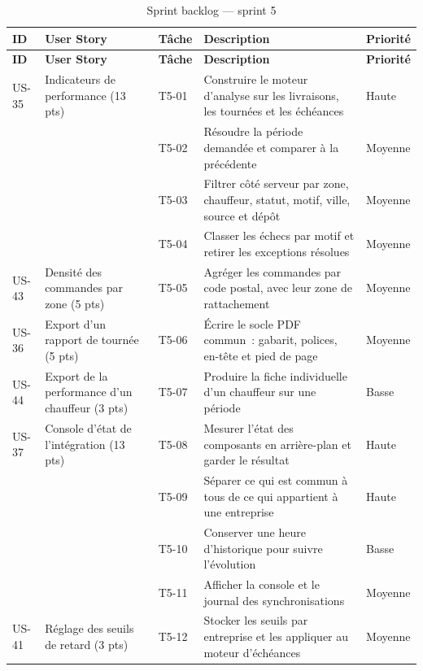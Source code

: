 \begin{small}
\begin{longtable}{L{1.1cm}L{3.0cm}L{1.2cm}L{7.0cm}L{1.4cm}}
\caption{Sprint backlog — sprint 5}\label{tab:backlog-s5}\\
\hline
{}
\textbf{ID} & \textbf{User Story} & \textbf{Tâche} & \textbf{Description} & \textbf{Priorité} \\
\hline
\endfirsthead
\hline
{}
\textbf{ID} & \textbf{User Story} & \textbf{Tâche} & \textbf{Description} & \textbf{Priorité} \\
\hline
\endhead
\hline
\endfoot

US-35 & Indicateurs de performance (13 pts) & T5-01 & Construire le moteur d'analyse sur les livraisons, les tournées et les échéances & Haute \\
\hline
      &  & T5-02 & Résoudre la période demandée et comparer à la précédente & Moyenne \\
\hline
      &  & T5-03 & Filtrer côté serveur par zone, chauffeur, statut, motif, ville, source et dépôt & Moyenne \\
\hline
      &  & T5-04 & Classer les échecs par motif et retirer les exceptions résolues & Moyenne \\
\hline
US-43 & Densité des commandes par zone (5 pts) & T5-05 & Agréger les commandes par code postal, avec leur zone de rattachement & Moyenne \\
\hline
US-36 & Export d'un rapport de tournée (5 pts) & T5-06 & Écrire le socle PDF commun~: gabarit, polices, en-tête et pied de page & Moyenne \\
\hline
US-44 & Export de la performance d'un chauffeur (3 pts) & T5-07 & Produire la fiche individuelle d'un chauffeur sur une période & Basse \\
\hline
US-37 & Console d'état de l'intégration (13 pts) & T5-08 & Mesurer l'état des composants en arrière-plan et garder le résultat & Haute \\
\hline
      &  & T5-09 & Séparer ce qui est commun à tous de ce qui appartient à une entreprise & Haute \\
\hline
      &  & T5-10 & Conserver une heure d'historique pour suivre l'évolution & Basse \\
\hline
      &  & T5-11 & Afficher la console et le journal des synchronisations & Moyenne \\
\hline
US-41 & Réglage des seuils de retard (3 pts) & T5-12 & Stocker les seuils par entreprise et les appliquer au moteur d'échéances & Moyenne \\

\end{longtable}
\end{small}
